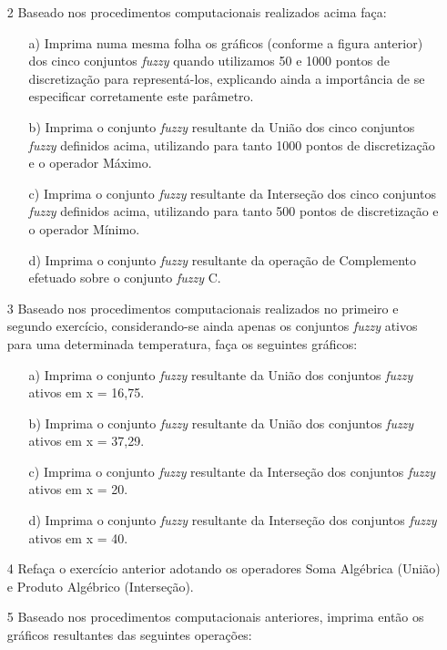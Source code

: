 \documentclass{report}
\begin{document}
\begin{enumerate}
\begin{enumerate}
\end{enumerate}

\item[2] Baseado nos procedimentos computacionais realizados acima faça:
\begin{enumerate}
\item[a)] Imprima numa mesma folha os gráficos (conforme a figura anterior) dos cinco conjuntos
\emph{fuzzy} quando utilizamos 50 e 1000 pontos de discretização para representá-los, explicando
ainda a importância de se especificar corretamente este parâmetro.


\item[b)] Imprima o conjunto \emph{fuzzy} resultante da União dos cinco conjuntos \emph{fuzzy} definidos acima,
utilizando para tanto 1000 pontos de discretização e o operador Máximo.


\item[c)] Imprima o conjunto \emph{fuzzy} resultante da Interseção dos cinco conjuntos \emph{fuzzy} definidos
acima, utilizando para tanto 500 pontos de discretização e o operador Mínimo.


\item[d)] Imprima o conjunto \emph{fuzzy} resultante da operação de Complemento efetuado sobre o
conjunto \emph{fuzzy} C. 
\end{enumerate}



\item[3] Baseado nos procedimentos computacionais realizados no primeiro e segundo exercício,
considerando-se ainda apenas os conjuntos \emph{fuzzy} ativos para uma determinada temperatura,
faça os seguintes gráficos:
\begin{enumerate}
\item[a)] Imprima o conjunto \emph{fuzzy} resultante da União dos conjuntos \emph{fuzzy} ativos em x = 16,75.
\item[b)] Imprima o conjunto \emph{fuzzy} resultante da União dos conjuntos \emph{fuzzy} ativos em x = 37,29.
\item[c)] Imprima o conjunto \emph{fuzzy} resultante da Interseção dos conjuntos \emph{fuzzy} ativos em x = 20.
\item[d)] Imprima o conjunto \emph{fuzzy} resultante da Interseção dos conjuntos \emph{fuzzy} ativos em x = 40.
\end{enumerate}


\item[4] Refaça o exercício anterior adotando os operadores Soma Algébrica (União) e Produto
Algébrico (Interseção).


\item[5] Baseado nos procedimentos computacionais anteriores, imprima então os gráficos resultantes
das seguintes operações:


\end{enumerate}
\end{document}
